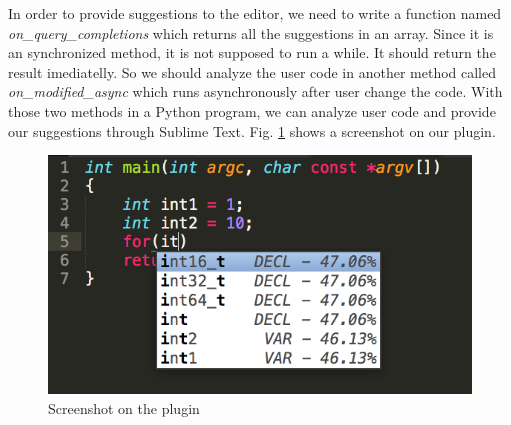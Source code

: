 \documentclass[prodmode,acmtecs]{acmsmall} %
\begin{document}
In order to provide suggestions to the editor, we need to write a function named {\it on\_query\_completions} which returns all the suggestions in an array. Since it is an synchronized method, it is not supposed to run a while. It should return the result imediatelly. So we should analyze the user code in another method called {\it on\_modified\_async} which runs asynchronously after user change the code. With those two methods in a Python program, we can analyze user code and provide our suggestions through Sublime Text. Fig. \ref{fig:sublimeplugin} shows a screenshot on our plugin.

\begin{figure}
\centerline{\includegraphics[width=1.0\textwidth]{sublimeplugin}}
\caption{Screenshot on the plugin}
\label{fig:sublimeplugin}
\end{figure}




 
\end{document}
